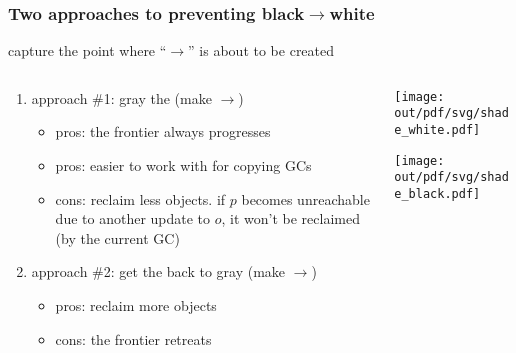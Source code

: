 \documentclass[11pt,dvipdfmx]{beamer}
\begin{document}
\begin{frame}
\frametitle{Two approaches to preventing black$\rightarrow$white}
capture the point where ``\blackbox$\rightarrow$\whitebox''
is about to be created
\begin{columns}
\begin{column}{0.75\textwidth}
\begin{enumerate}
\item approach \#1:
  gray the \whitebox (make \blackbox$\rightarrow$\graybox)
  \begin{itemize}
  \item pros: the frontier always progresses
  \item pros: easier to work with for copying GCs
  \item cons: reclaim less objects.
    if $p$ becomes unreachable due to another update to $o$,
    it won't be reclaimed (by the current GC)
  \end{itemize}
\item approach \#2:
  get the \blackbox back to gray
  (make \graybox$\rightarrow$\whitebox)
  \begin{itemize}
  \item pros: reclaim more objects
  \item cons: the frontier retreats
  \end{itemize}
\end{enumerate}
\end{column}

\begin{column}{0.25\textwidth}
\begin{center}
\texttt{[image: out/pdf/svg/shade\_white.pdf]}

\texttt{[image: out/pdf/svg/shade\_black.pdf]}
\end{center}
\end{column}
\end{columns}
\end{frame}
\fi
\end{document}
